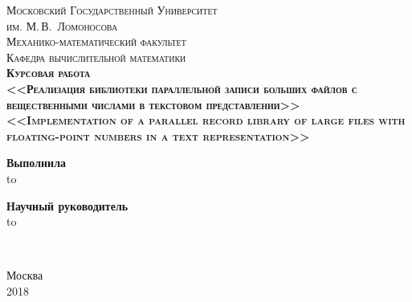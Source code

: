 \begin{titlepage}
	\begin{center}
		\textsc{ 
		{
			Московский Государственный Университет\\ им. М.\,В.~Ломоносова \\\vspace{15pt}
 			Механико-математический факультет \\ \vspace{15pt} 
 			Кафедра вычислительной математики
 			}
 		} 
		\\\vspace{40pt} 
		\textsc{\textbf{\large{Курсовая работа}}\\ \vspace{30pt}
			\large{
				\textbf{<<Реализация библиотеки параллельной записи больших файлов с вещественными числами в текстовом представлении>>} \\\vspace{30pt} 	
				\textbf{<<Implementation of a parallel record library of large files with floating-point numbers in a text representation>>}
			} 
		}
	\end{center}
	\vspace{3em} 
	\newbox{\lbox} 
	\newlength{\maxl} \setlength{\maxl}{\wd\lbox} \hfill\parbox{15em}
	{
		\hspace*{7em}\hspace*{-7em}
		\textbf{Выполнила}\\
	 	\hfill\hbox to \\ 
	}
	
	\newbox{\lbox} \hfill\parbox{15em}
	{
		\hspace*{7em}\hspace*{-7em}
		\textbf{Научный руководитель}\\
		\hfill\hbox to
	}
	\\ \vspace{30pt}
	\begin{center} 
		Москва \\ 
		2018
	\end{center} 
\end{titlepage}
